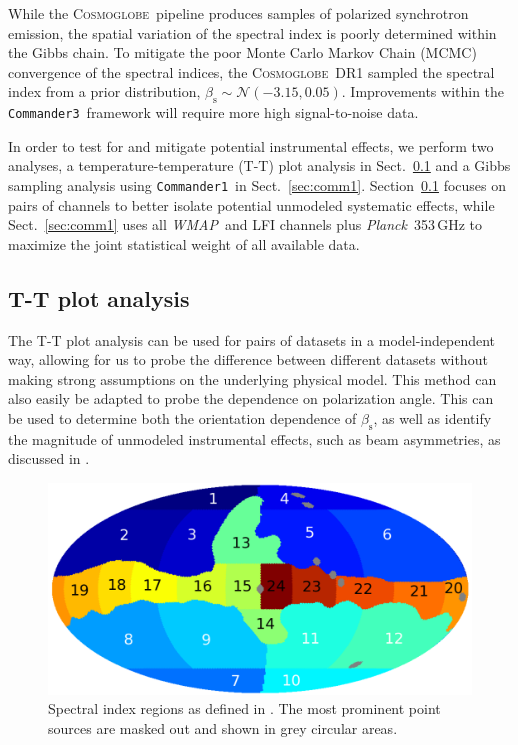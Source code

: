 \documentclass[twocolumn]{../../common/aa}
\def\WMAP{\emph{WMAP}}
\def\Planck{\emph{Planck}}
\def\commanderone{\texttt{Commander1}}
\def\commanderthree{\texttt{Commander3}}
\newcommand{\cosmoglobe}{\textsc{Cosmoglobe}}
\begin{document}
While the \cosmoglobe\ pipeline produces samples of polarized synchrotron emission, the spatial variation of the spectral index is poorly determined within the Gibbs chain. To mitigate the poor Monte Carlo Markov Chain (MCMC) convergence of the spectral indices, the \cosmoglobe\ DR1 sampled the spectral index from a prior distribution, $\beta_\mathrm s\sim\mathcal N(-3.15, 0.05)$. Improvements within the \commanderthree\ framework will require more high signal-to-noise data.

In order to test for and mitigate potential instrumental effects, we perform two analyses, a temperature-temperature (T-T) plot analysis in Sect.~\ref{sec:tt_plot} and a Gibbs sampling analysis using \commanderone\ in Sect.~\ref{sec:comm1}. Section~\ref{sec:tt_plot} focuses on pairs of channels to better isolate potential unmodeled systematic effects, while Sect.~\ref{sec:comm1} uses all \WMAP\ and LFI channels plus \Planck\ 353\,GHz to maximize the joint statistical weight of all available data.

\subsection{T-T plot analysis}
\label{sec:tt_plot}

The T-T plot analysis can be used for pairs of datasets in a model-independent way, allowing for us to probe the difference between different datasets without making strong assumptions on the underlying physical model. This method can also easily be adapted to probe the dependence on polarization angle. This can be used to determine both the orientation dependence of $\beta_\mathrm s$, as well as identify the magnitude of unmodeled instrumental effects, such as beam asymmetries, as discussed in \citet{wehus:2013}.


\begin{figure}
        \centering
        \includegraphics[width=\linewidth]{figures/utnymaske_tall_converted.pdf}
        \caption{Spectral index regions as defined in \citet{fuskeland2014}. The most prominent point sources are masked out and shown in grey circular areas.
        }
        \label{fig:regions}
\end{figure}
\end{document}
